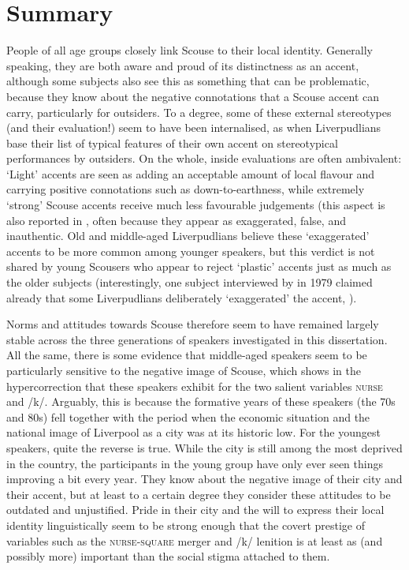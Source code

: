 \section{Summary}
\label{prod.disc.summary}

People of all age groups closely link Scouse to their local identity.
Generally speaking, they are both aware and proud of its distinctness as an accent, although some subjects also see this as something that can be problematic, because they know about the negative connotations that a Scouse accent can carry, particularly for outsiders.
To a degree, some of these external stereotypes (and their evaluation!) seem to have been internalised, as when Liverpudlians base their list of typical features of their own accent on stereotypical performances by outsiders.
On the whole, inside evaluations are often ambivalent: `Light' accents are seen as adding an acceptable amount of local flavour and carrying positive connotations such as down-to-earthness, while extremely `strong' Scouse accents receive much less favourable judgements (this aspect is also reported in \citealt[33]{delyon1981}, often because they appear as exaggerated, false, and inauthentic.
Old and middle-aged Liverpudlians believe these `exaggerated' accents to be more common among younger speakers, but this verdict is not shared by young Scousers who appear to reject `plastic' accents just as much as the older subjects (interestingly, one subject interviewed by \citeauthor{delyon1981} in 1979 claimed already that some Liverpudlians deliberately `exaggerated' the accent, \citealt[cf.][30]{delyon1981}).

Norms and attitudes towards Scouse therefore seem to have remained largely stable across the three generations of speakers investigated in this dissertation.
All the same, there is some evidence that middle-aged speakers seem to be particularly sensitive to the negative image of Scouse, which shows in the hypercorrection that these speakers exhibit for the two salient variables \textsc{nurse} and /k/.
Arguably, this is because the formative years of these speakers (the 70s and 80s) fell together with the period when the economic situation and the national image of Liverpool as a city was at its historic low.
For the youngest speakers, quite the reverse is true.
While the city is still among the most deprived in the country, the participants in the young group have only ever seen things improving a bit every year.
They know about the negative image of their city and their accent, but at least to a certain degree they consider these attitudes to be outdated and unjustified.
Pride in their city and the will to express their local identity linguistically seem to be strong enough that the covert prestige of variables such as the \textsc{nurse}-\textsc{square} merger and /k/ lenition is at least as (and possibly more) important than the social stigma attached to them.

